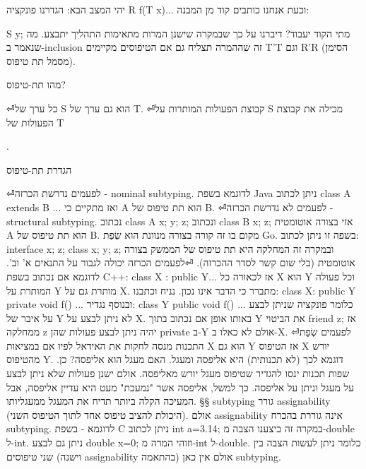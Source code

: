 יהי המצב הבא: הגדרנו פונקציה R f(T x){...} וכעת אנחנו כותבים קוד מן המבנה:

        S y;
מתי הקוד יעבוד? דיברנו על כך שבמקרה שישנן המרות מתאימות התהליך יתבצע. מה שנאמר ב-inclusion זה שההמרה תצליח גם אם הטיפוסים מקיימים T'T וגם R'R (הסימן מסמל תת טיפוס).

מהו תת-טיפוס?
        \begin{ציינון}
⏎כל ערך של S הוא גם ערך של T.
⏎קבוצת הפעולות המותרות על S מכילה את קבוצת הפעולות של T
      \end{ציינון}

        .

        הגדרת תת-טיפוס
        \begin{ציינון}
⏎לפעמים נדרשת הכרזה - nominal subtyping.
        לדוגמא בשפת Java ניתן לכתוב class A extends B {...} ואז מתקיים כי A הוא תת טיפוס של B.
⏎לפעמים לא נדרשת הכרזה - structural subtyping.
        נכתוב class A { x; y; z; } ונכתוב class B {x; z;} אזי בצורה אוטומטית A הוא תת טיפוס של B.
        מקום בו זה קורה בצורה מנוונת הוא שְׂפַת Go. בשפה זו ניתן לכתוב:
        interface { x; z; }
        class {x; y; z; }
        ובמקרה זה המחלקה היא תת טיפוס של הממשק בצורה אוטומטית (בלי שום קשר לסדר ההכרזה).
⏎לפעמים הכרזה יכולה לגבור על התנאים א' וב'.
        לדוגמא אם נכתוב בשפת C++:
        class X : public Y{...} אז לכאורה כל X הוא Y וכל פעולה המותרת על Y מותרת גם על X. מתברר כי הדבר אינו נכון.
        נניח וכתבנו:
        class X: public Y{
          private void f() {...}
        }
        ובנוסף נגדיר:
        class Y{
          public void f() {...}
        }
        כלומר פונקציה שניתן לבצע על איבר של Y לא ניתן לבצע על X.
        באותו אופן אם נכתוב בתוך Y את הביטוי friend z; אז ממחלקה z יהיה ניתן לבצע פעולות שהן private ב-Y אולם לא כאלו ב-X.
⏎לפעמים שְׂפַת התכנות מנסה לחקות את האידאל לפיו אם במציאות X הוא גם Y אז הטיפוס X יורש מהטיפוס Y.
        דוגמא לכך (לא תכנותית) היא אליפסה ומעגל.
        האם מעגל הוא אליפסה? כן.
        שפות תכנות ינסו להגדיר שטיפוס מעגל יורש מאליפסה. אולם ישנן פעולות שלא ניתן לבצע על מעגל וניתן על אליפסה. כך למשל, אליפסה אשר "נמעכת" מעט היא עדיין אליפסה, אבל המעיכה הקלה ביותר תדיח את המעגל ממעגליותו.
        §§ subtyping גורר assignability (היכולת להציב טיפוס אחד לתוך הטיפוס השני). אולם assignability אינה גוררת בהכרח subtyping.
        לדוגמא - בשפת C ניתן לכתוב int a=3.14; במקרה זה ביצענו הצבה מ-double ל-int.
        ניתן גם לבצע double x=0; וזוהי המרה מ-int ל-double. כלומר ניתן לעשות הצבה בין שני טיפוסים (וישנה assignability בהתאמה) אולם אין כאן subtyping.
    \end{ציינון}

